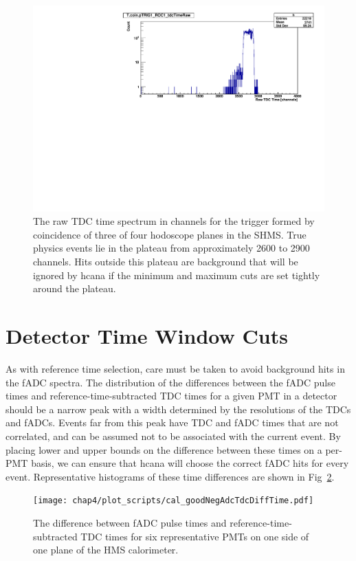 \begin{figure}[!h]
    \centering
    \includegraphics[width=1.0\textwidth]{chap4/coin3192_T_coin_pTRIG1_ROC1_tdcTimeRaw.pdf}
    \caption[
            The raw TDC time spectrum in channels for the trigger formed by
            coincidence of three of four hodoscope planes in the SHMS.]{
            The raw TDC time spectrum in channels for the trigger formed by
            coincidence of three of four hodoscope planes in the SHMS.
            True physics events lie in the plateau from approximately
            2600 to 2900 channels.
            Hits outside this plateau are background that will be ignored by
            hcana if the minimum and maximum cuts are set tightly around the
            plateau.
            }
    \label{fig:raw_tdc_time}
\end{figure}

\section{Detector Time Window Cuts}
As with reference time selection, care must be taken to avoid background hits
in the fADC spectra.
The distribution of the differences between the fADC pulse times and
reference-time-subtracted TDC times for a given PMT in a detector should
be a narrow peak with a width determined by the resolutions of the TDCs
and fADCs.
Events far from this peak have TDC and fADC times that are not correlated, and
can be assumed not to be associated with the current event.
By placing lower and upper bounds on the difference between these times on a
per-PMT basis, we can ensure that hcana will choose the correct fADC
hits for every event.
Representative histograms of these time differences are shown in
Fig~\ref{fig:cal_goodNegAdcTdcDiffTime}.


\begin{figure}[!h]
    \centering
    \texttt{[image: chap4/plot\_scripts/cal\_goodNegAdcTdcDiffTime.pdf]}
    \caption{
            The difference between fADC pulse times and
            reference-time-subtracted TDC times for six representative PMTs
            on one side of one plane of the HMS calorimeter.
            }
    \label{fig:cal_goodNegAdcTdcDiffTime}
\end{figure}
